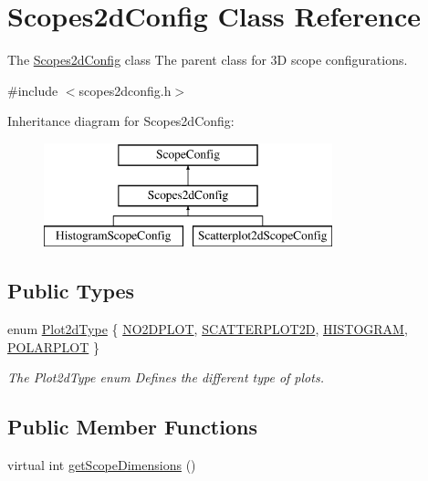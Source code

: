 \hypertarget{class_scopes2d_config}{\section{\-Scopes2d\-Config \-Class \-Reference}
\label{class_scopes2d_config}
}


\-The \hyperlink{class_scopes2d_config}{\-Scopes2d\-Config} class \-The parent class for 3\-D scope configurations.  




{\ttfamily \#include $<$scopes2dconfig.\-h$>$}

\-Inheritance diagram for \-Scopes2d\-Config\-:\begin{figure}[H]
\begin{center}
\leavevmode
\includegraphics[height=3.000000cm]{class_scopes2d_config}
\end{center}
\end{figure}
\subsection*{\-Public \-Types}
\begin{DoxyCompactItemize}
\item 
enum \hyperlink{group___scope_plugin_ga0fad4d5fa165d3cf65c53a66501eb830}{\-Plot2d\-Type} \{ \hyperlink{group___scope_plugin_gga0fad4d5fa165d3cf65c53a66501eb830a8a05ed744e85e763986c4c55bf561e67}{\-N\-O2\-D\-P\-L\-O\-T}, 
\hyperlink{group___scope_plugin_gga0fad4d5fa165d3cf65c53a66501eb830a4cc6659e6c550e7a821db4ad6d3ed4dc}{\-S\-C\-A\-T\-T\-E\-R\-P\-L\-O\-T2\-D}, 
\hyperlink{group___scope_plugin_gga0fad4d5fa165d3cf65c53a66501eb830a7f84951522a86b7b7a00ccc4fc58ad5a}{\-H\-I\-S\-T\-O\-G\-R\-A\-M}, 
\hyperlink{group___scope_plugin_gga0fad4d5fa165d3cf65c53a66501eb830a6d9b3ec0d944281832f5d0b2d474106a}{\-P\-O\-L\-A\-R\-P\-L\-O\-T}
 \}
\begin{DoxyCompactList}\small\item\em \-The \-Plot2d\-Type enum \-Defines the different type of plots. \end{DoxyCompactList}\end{DoxyCompactItemize}
\subsection*{\-Public \-Member \-Functions}
\begin{DoxyCompactItemize}
\item 
virtual int \hyperlink{group___scope_plugin_ga95a6bd24b6f73fad855102d785678676}{get\-Scope\-Dimensions} ()
\end{DoxyCompactItemize}


